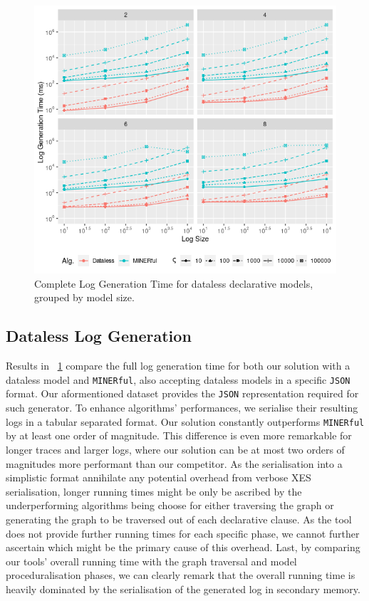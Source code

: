 \documentclass[sigconf]{acmart}
\begin{document}
\begin{figure}[!t]
\centering
\includegraphics[width=\linewidth]{fig/Minermer.png}
\caption{Complete Log Generation Time for dataless declarative models, grouped by model size.}\label{dataless}
\end{figure}
\subsection{Dataless Log Generation}\label{ssec:dataless}
Results in \figurename~\ref{dataless} compare the full log generation time for both our solution with a dataless model and \texttt{MINERful}, also accepting dataless models in a specific \texttt{JSON} format. Our aformentioned dataset provides the \texttt{JSON} representation required for such generator. To enhance algorithms' performances, we serialise their resulting logs in a tabular separated format. Our solution constantly outperforms \texttt{MINERful} by at least one order of magnitude. This difference is even more remarkable for longer traces and larger logs, where our solution can be at most two orders of magnitudes more performant than our competitor. As the serialisation into a simplistic format annihilate any potential overhead from verbose XES serialisation, longer running times might be only be ascribed by the underperforming algorithms being choose for either traversing the graph or generating the graph to be traversed out of each declarative clause. As the tool does not provide further running times for each specific phase, we cannot further ascertain which might be the primary cause of this overhead. Last, by comparing our tools' overall running time with the graph traversal and model proceduralisation phases, we can clearly remark that the overall running time is heavily dominated by the serialisation of the generated log in secondary memory.
\end{document}
